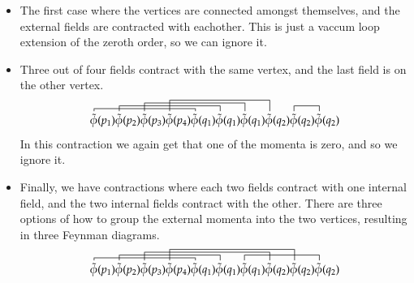\documentclass{article}
\begin{document}
\begin{itemize}
    \item The first case where the vertices are connected amongst themselves, and the external fields are contracted with eachother. This is just a vaccum loop extension of the zeroth order, so we can ignore it.
    \item Three out of four fields contract with the same vertex, and the last field is on the other vertex.
    \begin{equation}
        \contraction[0.25em]{}{\tilde{\phi}}{(p_1)\tilde{\phi}(p_2)\tilde{\phi}(p_3)\tilde{\phi}(p_4)}{\tilde{\phi}}
        \contraction[0.5em]{\tilde{\phi}(p_1)}{\tilde{\phi}}{(p_2)\tilde{\phi}(p_3)\tilde{\phi}(p_4)\tilde{\phi}(q_1)}{\tilde{\phi}}
        \contraction[0.75em]{\tilde{\phi}(p_1)\tilde{\phi}(p_2)}{\tilde{\phi}}{(p_3)\tilde{\phi}(p_4)\tilde{\phi}(q_1)\tilde{\phi}(q_1)}{\tilde{\phi}}
        \contraction[1em]{\tilde{\phi}(p_1)\tilde{\phi}(p_2)\tilde{\phi}(p_4)}{\tilde{\phi}}{(p_4)\tilde{\phi}(q_1)\tilde{\phi}(q_1)\tilde{\phi}(q_1)}{\tilde{\phi}}
        \contraction[0.5em]{\tilde{\phi}(p_1)\tilde{\phi}(p_2)\tilde{\phi}(p_3)\tilde{\phi}(p_4)\tilde{\phi}(q_1)\tilde{\phi}(q_1)\tilde{\phi}(q_1)\tilde{\phi}(q_2)}{\tilde{\phi}}{(q_2)}{\tilde{\phi}}
        \tilde{\phi}(p_1)\tilde{\phi}(p_2)\tilde{\phi}(p_3)\tilde{\phi}(p_4)
        \tilde{\phi}(q_1)\tilde{\phi}(q_1)\tilde{\phi}(q_1)
        \tilde{\phi}(q_2)\tilde{\phi}(q_2)\tilde{\phi}(q_2)
    \end{equation}
    In this contraction we again get that one of the momenta is zero, and so we ignore it.
    \item Finally, we have contractions where each two fields contract with one internal field, and the two internal fields contract with the other. There are three options of how to group the external momenta into the two vertices, resulting in three Feynman diagrams.
    \begin{equation}
        \contraction[0.25em]{}{\tilde{\phi}}{(p_1)\tilde{\phi}(p_2)\tilde{\phi}(p_3)\tilde{\phi}(p_4)}{\tilde{\phi}}
        \contraction[0.5em]{\tilde{\phi}(p_1)}{\tilde{\phi}}{(p_2)\tilde{\phi}(p_3)\tilde{\phi}(p_4)\tilde{\phi}(q_1)}{\tilde{\phi}}
        \contraction[0.75em]{\tilde{\phi}(p_1)\tilde{\phi}(p_2)}{\tilde{\phi}}{(p_3)\tilde{\phi}(p_4)\tilde{\phi}(q_1)\tilde{\phi}(q_1)\tilde{\phi}(q_1)}{\tilde{\phi}}
        \contraction[1em]{\tilde{\phi}(p_1)\tilde{\phi}(p_2)\tilde{\phi}(p_4)}{\tilde{\phi}}{(p_4)\tilde{\phi}(q_1)\tilde{\phi}(q_1)\tilde{\phi}(q_1)\tilde{\phi}(q_2)}{\tilde{\phi}}
        \contraction[0.5em]{\tilde{\phi}(p_1)\tilde{\phi}(p_2)\tilde{\phi}(p_3)\tilde{\phi}(p_4)\tilde{\phi}(q_1)\tilde{\phi}(q_1)}{\tilde{\phi}}{(q_1)\tilde{\phi}(q_2)\tilde{\phi}(q_2)}{\tilde{\phi}}
        \tilde{\phi}(p_1)\tilde{\phi}(p_2)\tilde{\phi}(p_3)\tilde{\phi}(p_4)
        \tilde{\phi}(q_1)\tilde{\phi}(q_1)\tilde{\phi}(q_1)
        \tilde{\phi}(q_2)\tilde{\phi}(q_2)\tilde{\phi}(q_2)
    \end{equation}
\end{itemize}
\end{document}
